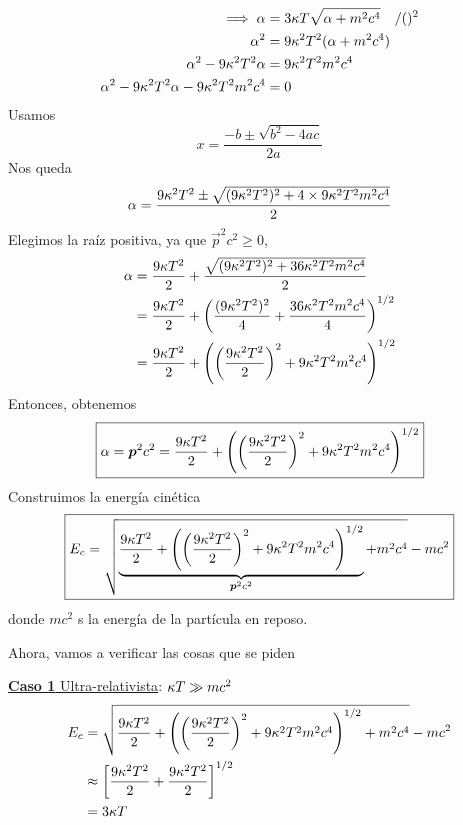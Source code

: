 \begin{sol}
\begin{align}
  \implies \alpha&=3\kappa T\sqrt{\alpha +m^2c^4}\quad /()^2\\
  \alpha^2&=9\kappa^2T^2(\alpha +m^2c^4)\\
  \alpha^2-9\kappa^2T^2\alpha &=9\kappa^2T^2m^2c^4\\
   \alpha^2-9\kappa^2T^2\alpha -9\kappa^2T^2m^2c^4&=0
\end{align}
Usamos 
\begin{equation}
  x=\frac{-b\pm\sqrt{b^2-4ac}}{2a}
\end{equation}
Nos queda
\begin{equation}
  \alpha=\frac{9\kappa^2T^2\pm\sqrt{(9\kappa^2T^2)^2+4\times 9\kappa^2T^2m^2c^4}}{2}
\end{equation}
Elegimos la raíz positiva, ya que $\vec{p}^2c^2\geq 0$,
\begin{align}
  \alpha&=\frac{9\kappa T^2}{2}+\frac{\sqrt{(9\kappa^2T^2)^2+36\kappa^2T^2m^2c^4}}{2}\\
  &=\frac{9\kappa T^2}{2}+\left(\frac{(9\kappa^2T^2)^2}{4}+\frac{36\kappa^2T^2m^2c^4}{4}\right)^{1/2}\\
  &=\frac{9\kappa T^2}{2}+\left(\left(\frac{9\kappa^2T^2}{2}\right)^2+9\kappa^2T^2m^2c^4\right)^{1/2}
\end{align}
Entonces, obtenemos
\begin{equation}
 \boxed{ \alpha=\vb*{p}^2c^2=\frac{9\kappa T^2}{2}+\left(\left(\frac{9\kappa^2T^2}{2}\right)^2+9\kappa^2T^2m^2c^4\right)^{1/2}}
\end{equation}
Construimos la energía cinética
\begin{equation}\label{14.1}
 \boxed{ E_c=\sqrt{\underbrace{\frac{9\kappa T^2}{2}+\left(\left(\frac{9\kappa^2T^2}{2}\right)^2+9\kappa^2T^2m^2c^4\right)^{1/2}}_{\vb*{p}^2c^2}+m^2c^4}-mc^2}
\end{equation}
donde $mc^2$ s la energía de la partícula en reposo.

Ahora, vamos a verificar las cosas que se piden


\underline{\textbf{Caso 1} Ultra-relativista}: $\kappa T\gg mc^2$
\begin{align}
  E_c&=\sqrt{\frac{9\kappa T^2}{2}+\left(\left(\frac{9\kappa^2T^2}{2}\right)^2+9\kappa^2T^2m^2c^4\right)^{1/2}+m^2c^4}-mc^2\\
  &\approx \left[\frac{9\kappa^2T^2}{2}+\frac{9\kappa^2T^2}{2}\right]^{1/2}\\
  &=3\kappa T
\end{align}


\end{sol}
